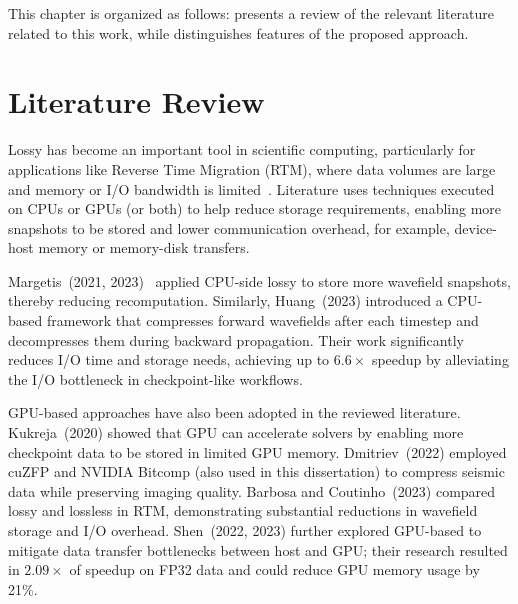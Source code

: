 \documentclass[Ingles]{ic-tese-v3}
\begin{document}
This chapter is organized as follows:  presents a review of the relevant literature related to this work, while  distinguishes features of the proposed approach.



\section{Literature Review}
\label{sec:review}

Lossy \compression has become an important tool in scientific computing, particularly for applications like Reverse Time Migration (RTM), where data volumes are large and memory or I/O bandwidth is limited~\cite{cappello2025,di2025}. Literature uses \compression techniques executed on CPUs or GPUs (or both) to help reduce storage requirements, enabling more snapshots to be stored and lower communication overhead, for example, device-host memory or memory-disk transfers.

Margetis~\etal(2021, 2023)~\cite{margetis2021,margetis2023} applied CPU-side lossy \compression to store more wavefield snapshots, thereby reducing recomputation. Similarly, Huang~\etal(2023)\cite{huang2023} introduced a CPU-based framework that compresses forward wavefields after each timestep and decompresses them during backward propagation. Their work significantly reduces I/O time and storage needs, achieving up to $6.6\times$ speedup by alleviating the I/O bottleneck in checkpoint-like workflows.



GPU-based approaches have also been adopted in the reviewed literature. Kukreja~\etal(2020)\cite{kukreja2020} showed that GPU \compression can accelerate solvers by enabling more checkpoint data to be stored in limited GPU memory. Dmitriev~\etal(2022)\cite{dmitriev2022} employed cuZFP and NVIDIA Bitcomp (also used in this dissertation) to compress seismic data while preserving imaging quality. Barbosa and Coutinho~(2023)\cite {barbosa2023} compared lossy and lossless \compression in RTM, demonstrating substantial reductions in wavefield storage and I/O overhead. Shen~\etal(2022, 2023)\cite{shen2022,shen2023} further explored GPU-based \compression to mitigate data transfer bottlenecks between host and GPU; their research resulted in $2.09\times$ of speedup on FP32 data and could reduce GPU memory usage by 21\%.
\end{document}
